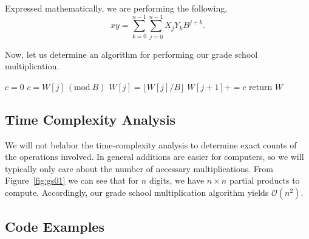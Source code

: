 \documentclass[psamsfonts,reqno]{amsart}
\newcommand{\Mod}[1]{\ (\mathrm{mod}\ #1)}
\theoremstyle{definition}
\theoremstyle{remark}
\numberwithin{equation}{section}
\begin{document}
Expressed mathematically, we are performing the following,
\begin{equation}
	\label{gsmul}
	xy = \sum_{k=0}^{n-1}\sum_{j=0}^{n-1}X_jY_kB^{j+k}.
\end{equation}

Now, let us determine an algorithm for performing our grade school multiplication. 

\begin{algorithm}[H]
	\caption{Grade School Multiplication}
	\label{gs_mult_algo}
	\begin{algorithmic}
		\EndFor
	\EndFor
	\State $c = 0$
		\State $c = W[j] \Mod{B}$				
		\State $W[j] = \lfloor W[j] / B \rfloor$
		\State $W[j+1] += c$
	\EndFor
	\State return $W$
\end{algorithmic}
\end{algorithm}

\subsection{Time Complexity Analysis \nopunct}

We will not belabor the time-complexity analysis to determine exact counts of the operations involved. In general additions are easier for computers, so we will typically only care about the number of necessary multiplications. From Figure~\ref{fig:gs01} we can see that for $n$ digits, we have $n \times n$ partial products to compute. Accordingly, our grade school multiplication algorithm yields $\mathcal{O}(n^2)$.

\subsection{Code Examples \nopunct}
\end{document}
